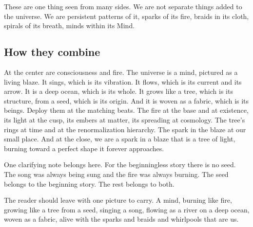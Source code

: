 These are one thing seen from many sides. We are not separate things added to the universe. We are persistent patterns of it, sparks of its fire, braids in its cloth, spirals of its breath, minds within its Mind.

\subsection{How they combine}

At the center are consciousness and fire. The universe is a mind, pictured as a living blaze. It sings, which is its vibration. It flows, which is its current and its arrow. It is a deep ocean, which is its whole. It grows like a tree, which is its structure, from a seed, which is its origin. And it is woven as a fabric, which is its beings. Deploy them at the matching beats. The fire at the base and at existence, its light at the cusp, its embers at matter, its spreading at cosmology. The tree's rings at time and at the renormalization hierarchy. The spark in the blaze at our small place. And at the close, we are a spark in a blaze that is a tree of light, burning toward a perfect shape it forever approaches.

One clarifying note belongs here. For the beginningless story there is no seed. The song was always being sung and the fire was always burning. The seed belongs to the beginning story. The rest belongs to both.


The reader should leave with one picture to carry. A mind, burning like fire, growing like a tree from a seed, singing a song, flowing as a river on a deep ocean, woven as a fabric, alive with the sparks and braids and whirlpools that are us.
